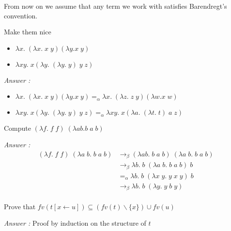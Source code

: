 \documentclass{article}
\theoremstyle{plain}
\theoremstyle{plain}
\begin{document}
  From now on we assume that any term we work with satisfies Barendregt’s
  convention.

  \exo Make them nice
    \begin{itemize}
      \item $\lambda x.\; (\lambda x.\; x\; y) (\lambda y. x\; y)$
      \item $\lambda x y.\; x (\lambda y.\; (\lambda y.\; y)\; y\; z)$
    \end{itemize}

  \textit{Answer :}
    \begin{itemize}
      \item $\lambda x.\; (\lambda x.\; x\; y) (\lambda y. x\; y) =_\alpha
        \lambda x.\; (\lambda z.\; z\; y) (\lambda w. x\; w)$
      \item $\lambda x y.\; x (\lambda y.\; (\lambda y.\; y)\; y\; z) =_\alpha
        \lambda x y.\; x (\lambda a.\; (\lambda t.\; t)\; a\; z)$
    \end{itemize}

  \exo Compute $(\lambda f.\; f\;f)\; (\lambda a b. b\;a\;b)$

  \textit{Answer :}
    \begin{align*}
      (\lambda f.\;f\;f)\; (\lambda a\; b.\;b\;a\;b) &\to_\beta
      (\lambda a b.\;b\;a\;b)\; (\lambda a\;b.\;b\;a\;b) \\
      &\to_\beta \lambda b.\;b\;(\lambda a\;b.\;b\;a\;b)\;b\\
      &=_\alpha \lambda b.\;b\;(\lambda x\;y.\;y\;x\;y)\;b\\
      &\to_\beta \lambda b.\;b\;(\lambda y.\;y\;b\;y)\\
    \end{align*}


  \exo Prove that $fv(t[x \leftarrow u]) \subseteq (fv(t) \backslash \{x\})
    \cup fv(u)$

  \textit{Answer :} Proof by induction on the structure of $t$
\end{document}
